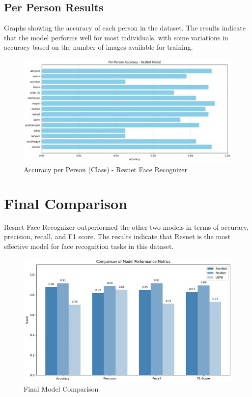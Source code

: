 \documentclass[openany]{report}
\begin{document}
\subsection{Per Person Results}
Graphs showing the accuracy of each person in the dataset. The results indicate that the model performs well for most individuals, with some variations in accuracy based on the number of images available for training.
\begin{figure}[H]
    \centering
    \includegraphics[width=.95\textwidth]{../imgs/model_3_per_person.jpg}
    \caption{Accuracy per Person (Class) - Resnet Face Recognizer}
\end{figure}

\section{Final Comparison} 
Resnet Face Recognizer outperformed the other two models in terms of accuracy, precision, recall, and F1 score. The results indicate that Resnet is the most effective model for face recognition tasks in this dataset.
\begin{figure}[H]
    \centering
    \includegraphics[width=.95\textwidth]{../imgs/final_model_comp.jpg}
    \caption{Final Model Comparison}
\end{figure}
\end{document}
